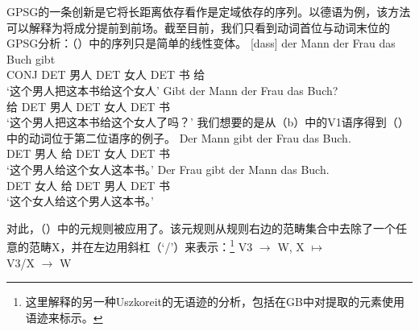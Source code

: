 GPSG的一条创新是它将长距离依存看作是定域依存的序列\citep{Gazdar81}。以德语为例，该方法可以解释为将成分提前到前场。截至目前，我们只看到动词首位与动词末位的GPSG分析：（）中的序列只是简单的线性变体。
\eal
\ex 
\gll {}[dass] der Mann der Frau das Buch gibt\\
	 {}\spacebr{}CONJ DET 男人 DET 女人 DET 书 给\\
\glt `这个男人把这本书给这个女人'
\ex 
\gll Gibt der Mann der Frau das Buch?\\
	 给 DET 男人 DET 女人 DET 书\\
\glt `这个男人把这本书给这个女人了吗？'
\zl
我们想要的是从（b）中的V1语序得到（）中的动词位于第二位语序的例子。
\eal
\ex 
\gll Der Mann gibt der Frau das Buch.\\
     DET 男人 给  DET 女人 DET 书\\
\glt `这个男人给这个女人这本书。'
\ex 
\gll Der Frau gibt der Mann das Buch.\\
     DET 女人 给 DET 男人 DET 书\\
\glt `这个女人给这个男人这本书。'
\zl

\noindent
对此，（）中的元规则被应用了。该元规则从规则右边的范畴集合中去除了一个任意的范畴X，并在左边用斜杠（`/'）来表示：\footnote{%
这里解释的另一种Uszkoreit的无语迹的分析\citeyearpar[]{Uszkoreit87a}，包括在GB中对提取的元素使用语迹来标示。
}
\ea
\label{meta-slash-intro}
V3  $\to$ W, X $\mapsto$\\
V3/X  $\to$ W
\z

